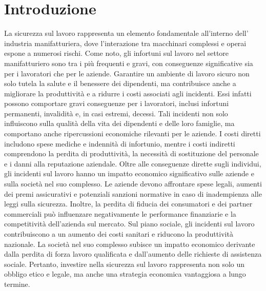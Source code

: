 \chapter{Introduzione}


La sicurezza sul lavoro rappresenta un elemento fondamentale all'interno dell' industria manifatturiera, dove l'interazione tra macchinari complessi e operai espone a numerosi rischi. Come noto, gli infortuni sul lavoro nel settore manifatturiero sono tra i più frequenti e gravi, con conseguenze significative sia per i lavoratori che per le aziende. Garantire un ambiente di lavoro sicuro non solo tutela la salute e il benessere dei dipendenti, ma contribuisce anche a migliorare la produttività e a ridurre i costi associati agli incidenti. Essi infatti possono comportare gravi conseguenze per i lavoratori, inclusi infortuni permanenti, invalidità e, in casi estremi, decessi. Tali incidenti non solo influiscono sulla qualità della vita dei dipendenti e delle loro famiglie, ma comportano anche ripercussioni economiche rilevanti per le aziende. I costi diretti includono spese mediche e indennità di infortunio, mentre i costi indiretti comprendono la perdita di produttività, la necessità di sostituzione del personale e i danni alla reputazione aziendale. Oltre alle conseguenze dirette sugli individui, gli incidenti sul lavoro hanno un impatto economico significativo sulle aziende e sulla società nel suo complesso. Le aziende devono affrontare spese legali, aumenti dei premi assicurativi e potenziali sanzioni normative in caso di inadempienza alle leggi sulla sicurezza. Inoltre, la perdita di fiducia dei consumatori e dei partner commerciali può influenzare negativamente le performance finanziarie e la competitività dell'azienda sul mercato. Sul piano sociale, gli incidenti sul lavoro contribuiscono a un aumento dei costi sanitari e riducono la produttività nazionale. La società nel suo complesso subisce un impatto economico derivante dalla perdita di forza lavoro qualificata e dall'aumento delle richieste di assistenza sociale. Pertanto, investire nella sicurezza sul lavoro rappresenta non solo un obbligo etico e legale, ma anche una strategia economica vantaggiosa a lungo termine.



